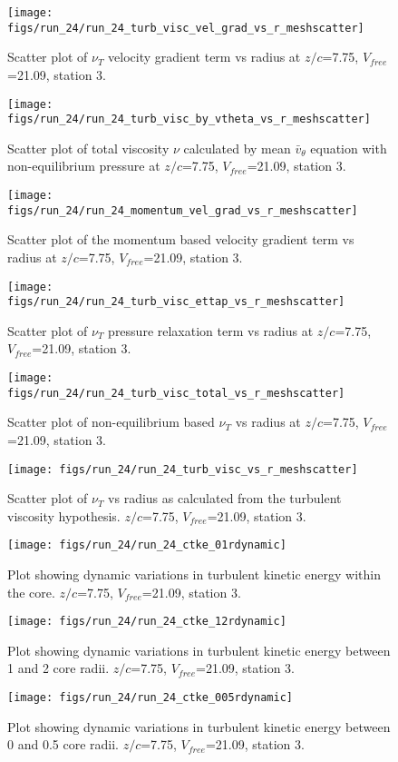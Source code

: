 \begin{figure}[H]
\centering
\texttt{[image: figs/run\_24/run\_24\_turb\_visc\_vel\_grad\_vs\_r\_meshscatter]}
\caption{Scatter plot of $\nu_T$ velocity gradient term vs radius at $z/c$=7.75, $V_{free}$=21.09, station 3.}
\end{figure}


\begin{figure}[H]
\centering
\texttt{[image: figs/run\_24/run\_24\_turb\_visc\_by\_vtheta\_vs\_r\_meshscatter]}
\caption{Scatter plot of total viscosity $\nu$ calculated by mean $\bar{v}_{\theta}$ equation with non-equilibrium pressure at $z/c$=7.75, $V_{free}$=21.09, station 3.}
\end{figure}


\begin{figure}[H]
\centering
\texttt{[image: figs/run\_24/run\_24\_momentum\_vel\_grad\_vs\_r\_meshscatter]}
\caption{Scatter plot of the momentum based velocity gradient term vs radius at $z/c$=7.75, $V_{free}$=21.09, station 3.}
\end{figure}


\begin{figure}[H]
\centering
\texttt{[image: figs/run\_24/run\_24\_turb\_visc\_ettap\_vs\_r\_meshscatter]}
\caption{Scatter plot of $\nu_T$ pressure relaxation term vs radius at $z/c$=7.75, $V_{free}$=21.09, station 3.}
\end{figure}


\begin{figure}[H]
\centering
\texttt{[image: figs/run\_24/run\_24\_turb\_visc\_total\_vs\_r\_meshscatter]}
\caption{Scatter plot of non-equilibrium based $\nu_T$ vs radius at $z/c$=7.75, $V_{free}$=21.09, station 3.}
\end{figure}


\begin{figure}[H]
\centering
\texttt{[image: figs/run\_24/run\_24\_turb\_visc\_vs\_r\_meshscatter]}
\caption{Scatter plot of $\nu_T$ vs radius as calculated from the turbulent viscosity hypothesis. $z/c$=7.75, $V_{free}$=21.09, station 3.}
\end{figure}


\begin{figure}[H]
\centering
\texttt{[image: figs/run\_24/run\_24\_ctke\_01rdynamic]}
\caption{Plot showing dynamic variations in turbulent kinetic energy within the core. $z/c$=7.75, $V_{free}$=21.09, station 3.}
\end{figure}


\begin{figure}[H]
\centering
\texttt{[image: figs/run\_24/run\_24\_ctke\_12rdynamic]}
\caption{Plot showing dynamic variations in turbulent kinetic energy between 1 and 2 core radii. $z/c$=7.75, $V_{free}$=21.09, station 3.}
\end{figure}


\begin{figure}[H]
\centering
\texttt{[image: figs/run\_24/run\_24\_ctke\_005rdynamic]}
\caption{Plot showing dynamic variations in turbulent kinetic energy between 0 and 0.5 core radii. $z/c$=7.75, $V_{free}$=21.09, station 3.}
\end{figure}


